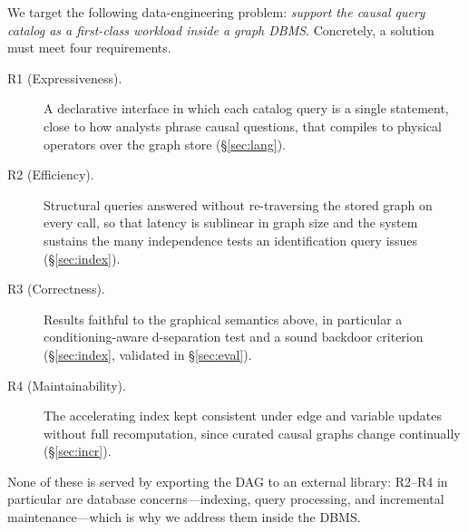 We target the following data-engineering problem: \emph{support the causal query
catalog as a first-class workload inside a graph DBMS}. Concretely, a solution
must meet four requirements.
\begin{description}
  \item[R1 (Expressiveness).] A declarative interface in which each catalog query
  is a single statement, close to how analysts phrase causal questions, that
  compiles to physical operators over the graph store (\S\ref{sec:lang}).
  \item[R2 (Efficiency).] Structural queries answered without re-traversing the
  stored graph on every call, so that latency is sublinear in graph size and the
  system sustains the many independence tests an identification query issues
  (\S\ref{sec:index}).
  \item[R3 (Correctness).] Results faithful to the graphical semantics above,
  in particular a conditioning-aware d-separation test and a sound backdoor
  criterion (\S\ref{sec:index}, validated in \S\ref{sec:eval}).
  \item[R4 (Maintainability).] The accelerating index kept consistent under edge
  and variable updates without full recomputation, since curated causal graphs
  change continually (\S\ref{sec:incr}).
\end{description}
None of these is served by exporting the DAG to an external library: R2--R4 in
particular are database concerns---indexing, query processing, and incremental
maintenance---which is why we address them inside the DBMS.
